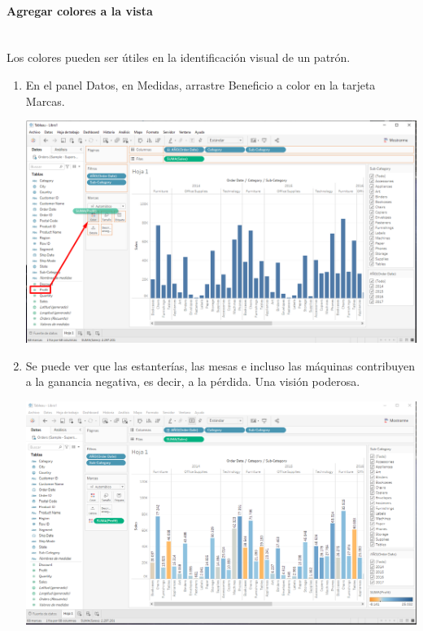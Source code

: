 \documentclass[12pt,letterpaper]{article}
\begin{document}
    \paragraph{\large Agregar colores a la vista\\ \\}
    Los colores pueden ser útiles en la identificación visual de un patrón.
    \begin{enumerate}
        \item En el panel Datos, en Medidas, arrastre Beneficio a color en la tarjeta Marcas.
        \begin{center}
            \includegraphics[width=15cm]{./img/img20.png}
        \end{center}
        \item Se puede ver que las estanterías, las mesas e incluso las máquinas contribuyen a la ganancia negativa, es decir, a la pérdida. Una visión poderosa.
        \begin{center}
            \includegraphics[width=15cm]{./img/img21.png}
        \end{center}
    \end{enumerate}
\end{document}
